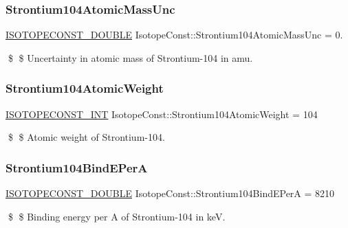 \subsubsection{\texorpdfstring{Strontium104\+Atomic\+Mass\+Unc}{Strontium104AtomicMassUnc}}
{\footnotesize\ttfamily \mbox{\hyperlink{group___isotope_const-_macros_ga8f45a7272ce02c0b4c65c44636ed719a}{I\+S\+O\+T\+O\+P\+E\+C\+O\+N\+S\+T\+\_\+\+D\+O\+U\+B\+LE}} Isotope\+Const\+::\+Strontium104\+Atomic\+Mass\+Unc = 0.}

\$ \$ Uncertainty in atomic mass of Strontium-\/104 in amu. \mbox{\label{group___isotope_const-_strontium-_sr104_ga088ea7f3a2a49beee2b30464fd158f19}} 
\subsubsection{\texorpdfstring{Strontium104\+Atomic\+Weight}{Strontium104AtomicWeight}}
{\footnotesize\ttfamily \mbox{\hyperlink{group___isotope_const-_macros_ga5f18360b3e99483a35c32d789e62621c}{I\+S\+O\+T\+O\+P\+E\+C\+O\+N\+S\+T\+\_\+\+I\+NT}} Isotope\+Const\+::\+Strontium104\+Atomic\+Weight = 104}

\$ \$ Atomic weight of Strontium-\/104. \mbox{\label{group___isotope_const-_strontium-_sr104_ga4a8a71c4f85d88107a19ce6375ae27e4}} 
\subsubsection{\texorpdfstring{Strontium104\+Bind\+E\+PerA}{Strontium104BindEPerA}}
{\footnotesize\ttfamily \mbox{\hyperlink{group___isotope_const-_macros_ga8f45a7272ce02c0b4c65c44636ed719a}{I\+S\+O\+T\+O\+P\+E\+C\+O\+N\+S\+T\+\_\+\+D\+O\+U\+B\+LE}} Isotope\+Const\+::\+Strontium104\+Bind\+E\+PerA = 8210}

\$ \$ Binding energy per A of Strontium-\/104 in keV. \mbox{\label{group___isotope_const-_strontium-_sr104_gabb3be4d2a5abf95b02768f685da35376}} 
